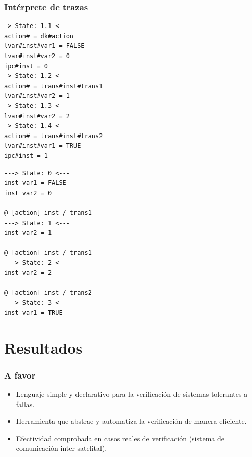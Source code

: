 \documentclass[serif]{beamer}
\begin{document}
\begin{frame}[fragile]
\frametitle{Intérprete de trazas}
{\fontsize{9pt}{12pt}\selectfont
\begin{minipage}{0.5\textwidth}
\begin{verbatim}
-> State: 1.1 <-
action# = dk#action
lvar#inst#var1 = FALSE
lvar#inst#var2 = 0
ipc#inst = 0
-> State: 1.2 <-
action# = trans#inst#trans1
lvar#inst#var2 = 1
-> State: 1.3 <-
lvar#inst#var2 = 2
-> State: 1.4 <-
action# = trans#inst#trans2
lvar#inst#var1 = TRUE
ipc#inst = 1
\end{verbatim}
\end{minipage}
\hspace{0.04\textwidth}
\begin{minipage}{0.44\textwidth}
\begin{verbatim}
---> State: 0 <---
inst var1 = FALSE
inst var2 = 0

@ [action] inst / trans1
---> State: 1 <---
inst var2 = 1

@ [action] inst / trans1
---> State: 2 <---
inst var2 = 2

@ [action] inst / trans2
---> State: 3 <---
inst var1 = TRUE
\end{verbatim}
\end{minipage}
} %
\end{frame}


\section{Resultados}
\begin{frame}
\frametitle{A favor}
\begin{itemize}\itemsep15pt

\item Lenguaje simple y declarativo para la verificación de sistemas tolerantes 
a fallas.

\item Herramienta que abstrae y automatiza la verificación de manera eficiente.

\item Efectividad comprobada en casos reales de verificación (sistema de 
comunicación inter-satelital).

\end{itemize}
\end{frame}
\end{document}
